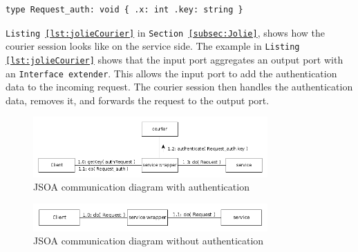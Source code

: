 \documentclass[12pt,a4paper]{article}
\begin{document}
\begin{lstlisting}[caption={Simple Jolie data with authentication key},label={lst:jolieDataWithAuth}]
type Request_auth: void { .x: int .key: string }
\end{lstlisting}

\texttt{Listing \ref{lst:jolieCourier}} in \texttt{Section \ref{subsec:Jolie}}, shows how the courier session looks like on the service side. The example in \texttt{Listing \ref{lst:jolieCourier}} shows that the input port aggregates an output port with an \texttt{Interface extender}. This allows the input port to add the authentication data to the incoming request. The courier session then handles the authentication data, removes it, and forwards the request to the output port.

\begin{figure}[h!]
  \centering
    \includegraphics[width=0.8\textwidth]{../figures/jsoa_generic_authentication_communication_diagram.png}
  \caption{JSOA communication diagram with authentication}
  \label{fig:jsoaAuthArchitecture}
\end{figure}

\begin{figure}[h!]
  \centering
    \includegraphics[width=0.8\textwidth]{../figures/jsoa_generic_no_authentication_communication_diagram.png}
  \caption{JSOA communication diagram without authentication}
  \label{fig:jsoaNoAuthArchitecture}
\end{figure}
\end{document}
